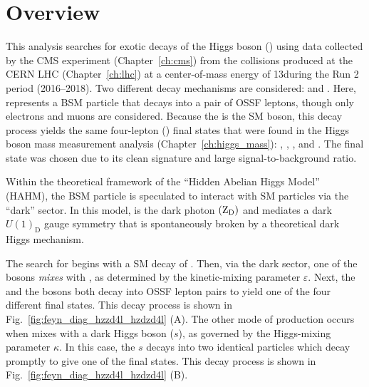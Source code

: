 \section{Overview}
This analysis searches for exotic decays of the Higgs boson (\PH) using data collected by the CMS experiment (Chapter~\ref{ch:cms}) from the \pp collisions produced at the CERN LHC (Chapter~\ref{ch:lhc}) at a center-of-mass energy of 13\TeV during the Run 2 period (2016--2018).
Two different decay mechanisms are considered: \htozx and \htoxx.
Here, \PX represents a BSM particle that decays into a pair of OSSF leptons, though only electrons and muons are considered.
Because the \PZ is the SM \PZ boson, this decay process yields the same four-lepton (\fourl) final states that were found in the Higgs boson mass measurement analysis (Chapter~\ref{ch:higgs_mass}):
\foure, \fourmu, \twoetwomu, and \twomutwoe.
The \fourl final state was chosen due to its clean signature and large signal-to-background ratio.

Within the theoretical framework of the ``Hidden Abelian Higgs Model'' (HAHM), the BSM particle \PX is speculated to interact with SM particles via the ``dark'' sector.  %
In this model, \PX is the dark photon $\left( \mathrm{Z}_\text{D} \right)$ and mediates a dark $U(1)_\text{D}$ gauge symmetry that is spontaneously broken by a theoretical dark Higgs mechanism.

The search for \PZD begins with a SM decay of \htozznostar.
Then, via the dark sector, one of the \PZ bosons \emph{mixes} with \PZD, as determined by the kinetic-mixing parameter $\varepsilon$.
Next, the \PZD and the \PZ bosons both decay into OSSF lepton pairs to yield one of the four different \fourl final states.
This decay process is shown in Fig.~\ref{fig:feyn_diag_hzzd4l_hzdzd4l} (A).
The other mode of \PZD production occurs when \PH mixes with a dark Higgs boson ($s$), as governed by the Higgs-mixing parameter $\mathcal{\kappa}$.  %
In this case, the $s$ decays into two identical \PZD particles which decay promptly to give one of the \fourl final states.
This decay process is shown in Fig.~\ref{fig:feyn_diag_hzzd4l_hzdzd4l} (B).

    

